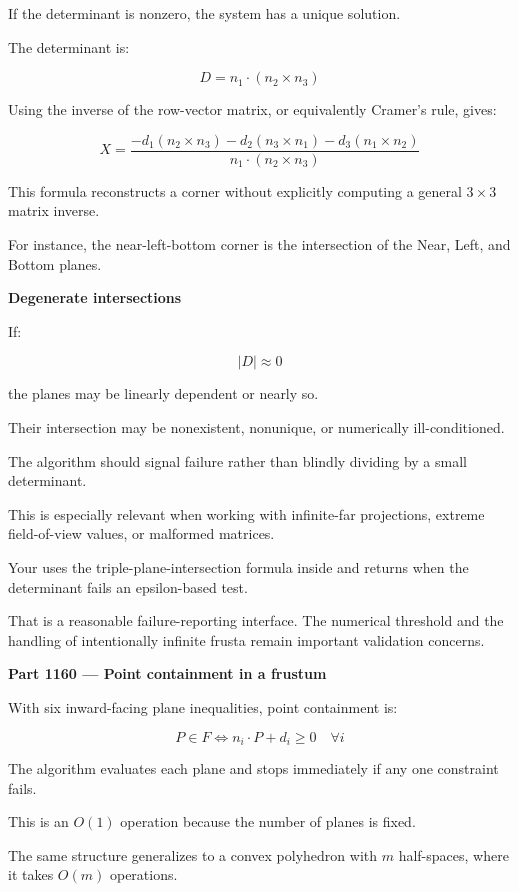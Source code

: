 If the determinant is nonzero, the system has a unique solution.

The determinant is:

\[
D=n_1\cdot(n_2\times n_3)
\]

Using the inverse of the row-vector matrix, or equivalently Cramer's rule, gives:

\[
\boxed{ X= \frac{ -d_1(n_2\times n_3) -d_2(n_3\times n_1) -d_3(n_1\times n_2) }{ n_1\cdot(n_2\times n_3) } }
\]

This formula reconstructs a corner without explicitly computing a general \(3\times3\) matrix inverse.

For instance, the near-left-bottom corner is the intersection of the Near, Left, and Bottom planes.

\textbf{Degenerate intersections}

If:

\[
|D|\approx0
\]

the planes may be linearly dependent or nearly so.

Their intersection may be nonexistent, nonunique, or numerically ill-conditioned.

The algorithm should signal failure rather than blindly dividing by a small determinant.

This is especially relevant when working with infinite-far projections, extreme field-of-view values, or malformed matrices.

Your  uses the triple-plane-intersection formula inside  and returns  when the determinant fails an epsilon-based test.

That is a reasonable failure-reporting interface. The numerical threshold and the handling of intentionally infinite frusta remain important validation concerns.

\textbf{Part 1160 --- Point containment in a frustum}

With six inward-facing plane inequalities, point containment is:

\[
\boxed{ P\in F \iff n_i\cdot P+d_i\ge0 \quad\forall i }
\]

The algorithm evaluates each plane and stops immediately if any one constraint fails.

This is an \(O(1)\) operation because the number of planes is fixed.

The same structure generalizes to a convex polyhedron with \(m\) half-spaces, where it takes \(O(m)\) operations.

